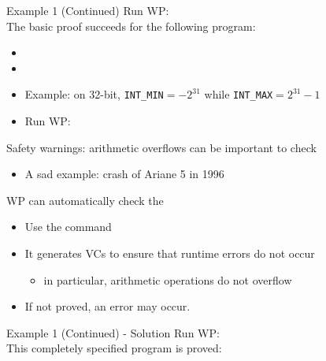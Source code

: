 \begin{frame}[fragile]{Example 1 (Continued)}
Run WP:
\\
The basic proof succeeds for the following program:\\[3mm]

\begin{itemize} 
\item<1-> 
\item<2->  %
\item<2-> Example: on 32-bit, \lstinline'INT_MIN'$=-2^{31}$ while \lstinline'INT_MAX'$=2^{31}-1$%
\item<2-> Run WP:
\\
\end{itemize} %
\end{frame}

\begin{frame}[fragile]{Safety warnings: arithmetic overflows}
 can be important to check 
\begin{itemize}
\item A sad example: crash of Ariane 5 in 1996
\end{itemize}

\vspace{5mm}
WP can automatically check the 
\begin{itemize}
\item Use the command 
\item It generates VCs to ensure that runtime errors do not occur
\begin{itemize}
\item 
in particular, arithmetic operations do not overflow
\end{itemize}
\item If not proved, an error may occur. 
\end{itemize}
\end{frame}

\begin{frame}[fragile]{Example 1 (Continued) - Solution}
Run WP:
\\
This completely specified program is proved:\\[3mm]

\end{frame}

